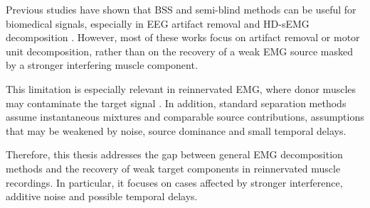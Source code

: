 Previous studies have shown that BSS and semi-blind methods can be useful for biomedical signals, especially in EEG artifact removal and HD-sEMG decomposition \cite{jung_extended_1998,chen_2cfastica_2024}. However, most of these works focus on artifact removal or motor unit decomposition, rather than on the recovery of a weak EMG source masked by a stronger interfering muscle component.

This limitation is especially relevant in reinnervated EMG, where donor muscles may contaminate the target signal \cite{vu_regenerative_2020,tuffaha_vascularized_2020,tang_improving_2025}. In addition, standard separation methods assume instantaneous mixtures and
comparable source contributions, assumptions that may be weakened by noise,
source dominance and small temporal delays.

Therefore, this thesis addresses the gap between general EMG decomposition
methods and the recovery of weak target components in reinnervated muscle
recordings. In particular, it focuses on cases affected by stronger interference, additive
noise and possible temporal delays.